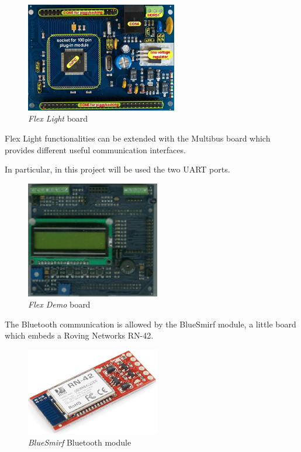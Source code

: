 \documentclass[twoside]{article}
\begin{document}
\begin{multicols}{2}
\begin{figure}[H]
  \centering
  \includegraphics[width=2.6in]{img/flex_light_presentation}
  \caption{\textit{Flex Light} board}
\end{figure}

Flex Light functionalities can be extended with the Multibus board which provides different useful communication interfaces.

In particular, in this project will be used the two UART ports.



\begin{figure}[H]
  \centering
  \includegraphics[width=2.3in]{img/flex_demo_board_presentation}
  \caption{\textit{Flex Demo} board}
\end{figure}

The Bluetooth communication is allowed by the BlueSmirf module, a little board which embeds a Roving Networks RN-42.

\begin{figure}[H]
  \centering
  \includegraphics[width=2.3in]{img/bluesmirf_presentation}
  \caption{\textit{BlueSmirf} Bluetooth module}
\end{figure}


\end{multicols}
\end{document}
